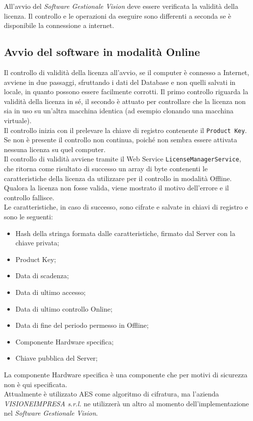 All’avvio del \textit{Software Gestionale Vision} deve essere verificata la validità della licenza. Il controllo e le operazioni da eseguire sono differenti a seconda se è disponibile la connessione a internet. 

\subsection{Avvio del software in modalità Online}

Il controllo di validità della licenza all'avvio, se il computer è connesso a Internet, avviene in due passaggi, sfruttando i dati del Database e non quelli salvati in locale, in quanto possono essere facilmente corrotti. Il primo controllo riguarda la validità della licenza in sé, il secondo è attuato per controllare che la licenza non sia in uso su un'altra macchina identica (ad esempio clonando una macchina virtuale).\\
Il controllo inizia con il prelevare la chiave di registro contenente il \texttt{Product Key}. Se non è presente il controllo non continua, poiché non sembra essere attivata nessuna licenza su quel computer.\\  
Il controllo di validità avviene tramite il Web Service \texttt{LicenseManagerService}, che ritorna come risultato di successo un array di byte contenenti le caratteristiche della licenza da utilizzare per il controllo in modalità Offline. Qualora la licenza non fosse valida, viene mostrato il motivo dell’errore e il controllo fallisce.
\\Le caratteristiche, in caso di successo, sono cifrate e salvate in chiavi di registro e sono le seguenti: 
\begin{itemize}
\item Hash della stringa formata dalle caratteristiche, firmato dal Server con la chiave privata;
\item Product Key;
\item Data di scadenza;
\item Data di ultimo accesso;
\item Data di ultimo controllo Online;
\item Data di fine del periodo permesso in Offline;
\item Componente Hardware specifica;
\item Chiave pubblica del Server;
\end{itemize}

La componente Hardware specifica è una componente che per motivi di sicurezza non è qui specificata.\\
Attualmente è utilizzato \gls{AES} come algoritmo di cifratura, ma l'azienda \textit{VISIONEIMPRESA s.r.l.} ne utilizzerà un altro al momento dell'implementazione nel \textit{Software Gestionale Vision}.

